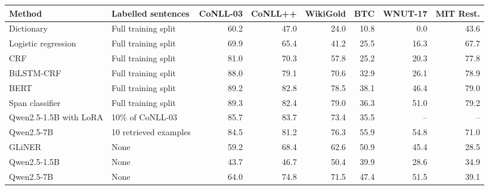 \begingroup\small\setlength{\tabcolsep}{3pt}
\begin{tabular*}{\linewidth}{@{\extracolsep{\fill}}llrrrrrr@{}}
\toprule
Method & Labelled sentences & CoNLL-03 & CoNLL++ & WikiGold & BTC & WNUT-17 & MIT Rest. \\
\midrule
Dictionary & Full training split & 60.2 & 47.0 & 24.0 & 10.8 & 0.0 & 43.6 \\
Logistic regression & Full training split & 69.9 & 65.4 & 41.2 & 25.5 & 16.3 & 67.7 \\
CRF & Full training split & 81.0 & 70.3 & 57.8 & 25.2 & 20.3 & 77.8 \\
BiLSTM-CRF & Full training split & 88.0 & 79.1 & 70.6 & 32.9 & 26.1 & 78.9 \\
BERT & Full training split & 89.2 & 82.8 & 78.5 & 38.1 & 46.4 & 79.0 \\
Span classifier & Full training split & 89.3 & 82.4 & 79.0 & 36.3 & 51.0 & 79.2 \\
Qwen2.5-1.5B with LoRA & 10\% of CoNLL-03 & 85.7 & 83.7 & 73.4 & 35.5 & -- & -- \\
Qwen2.5-7B & 10 retrieved examples & 84.5 & 81.2 & 76.3 & 55.9 & 54.8 & 71.0 \\
GLiNER & None & 59.2 & 68.4 & 62.6 & 50.9 & 45.4 & 28.5 \\
Qwen2.5-1.5B & None & 43.7 & 46.7 & 50.4 & 39.9 & 28.6 & 34.9 \\
Qwen2.5-7B & None & 64.0 & 74.8 & 71.5 & 47.4 & 51.5 & 39.1 \\
\bottomrule
\end{tabular*}
\endgroup
